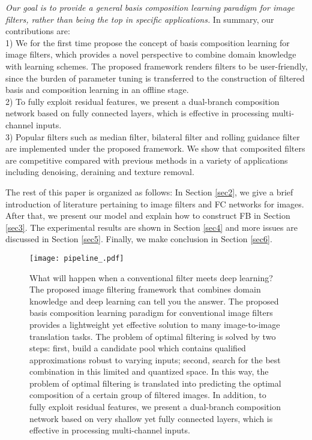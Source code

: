 \documentclass[twocolumn]{svjour3}          %
\begin{document}
\textit{Our goal is to provide a general basis composition learning paradigm for image filters, rather than being the top in specific applications.} In summary, our contributions are:\\
1) We for the first time propose the concept of basis composition learning for image filters, which provides a novel perspective to combine domain knowledge with learning schemes. The proposed framework renders filters to be user-friendly, since the burden of parameter tuning is transferred to the construction of filtered basis and composition learning in an offline stage.\\
2) To fully exploit residual features, we present a dual-branch composition network based on fully connected layers, which is effective in processing multi-channel inputs.\\
3) Popular filters such as median filter, bilateral filter and rolling guidance filter are implemented under the proposed framework. We show that composited filters are competitive compared with previous methods in a variety of applications including denoising, deraining and texture removal.

The rest of this paper is organized as follows: In Section \ref{sec2}, we give a brief introduction of literature pertaining to image filters and FC networks for images. After that, we present our model and explain how to construct FB in Section \ref{sec3}. The experimental results are shown in Section \ref{sec4} and more issues are discussed in Section \ref{sec5}. Finally, we make conclusion in Section \ref{sec6}.

\begin{figure*}[]
	\centering
	\texttt{[image: pipeline\_.pdf]}
	\caption{What will happen when a conventional filter meets deep learning? The proposed image filtering framework that combines domain knowledge and deep learning can tell you the answer. The proposed basis composition learning paradigm for conventional image filters provides a lightweight yet effective solution to many image-to-image translation tasks. The problem of optimal filtering is solved by two steps: first, build a candidate pool which contains qualified approximations robust to varying inputs; second, search for the best combination in this limited and quantized space. In this way, the problem of optimal filtering is translated into predicting the optimal composition of a certain group of filtered images. In addition, to fully exploit residual features, we present a dual-branch composition network based on very shallow yet fully connected layers, which is effective in processing multi-channel inputs.}
	\label{pipeline}
\end{figure*}
\end{document}
